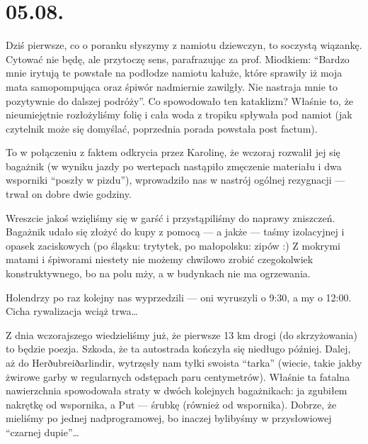 \chapter*{05.08.}

Dziś pierwsze, co o poranku słyszymy z namiotu dziewczyn, to soczystą wiązankę. Cytować nie będę, ale przytoczę sens, parafrazując za prof. Miodkiem: “Bardzo mnie irytują te powstałe na podłodze namiotu kałuże, które sprawiły iż moja mata samopompująca oraz śpiwór nadmiernie zawilgły. Nie nastraja mnie to pozytywnie do dalszej podróży”. Co spowodowało ten kataklizm? Właśnie to, że nieumiejętnie rozłożyliśmy folię i cała woda z tropiku spływała pod namiot (jak czytelnik może się domyślać, poprzednia porada powstała post factum).

To w połączeniu z faktem odkrycia przez Karolinę, że wczoraj rozwalił jej się bagażnik (w wyniku jazdy po wertepach nastąpiło zmęczenie materiału i dwa wsporniki “poszły w pizdu”), wprowadziło nas w nastrój ogólnej rezygnacji --- trwał on dobre dwie godziny.

Wreszcie jakoś wzięliśmy się w garść i przystąpiliśmy do naprawy zniszczeń. Bagażnik udało się złożyć do kupy z pomocą --- a jakże --- taśmy izolacyjnej i opasek zaciskowych (po śląsku: trytytek, po małopolsku: zipów :) Z mokrymi matami i śpiworami niestety nie możemy chwilowo zrobić czegokolwiek konstruktywnego, bo na polu mży, a w budynkach nie ma ogrzewania.

Holendrzy po raz kolejny nas wyprzedzili --- oni wyruszyli o 9:30, a my o 12:00. Cicha rywalizacja wciąż trwa…

Z dnia wczorajszego wiedzieliśmy już, że pierwsze 13 km drogi (do skrzyżowania) to będzie poezja. Szkoda, że ta autostrada kończyła się niedługo później. Dalej, aż do Herðubreiðarlindir, wytrzęsły nam tyłki swoista “tarka” (wiecie, takie jakby żwirowe garby w regularnych odstępach paru centymetrów). Właśnie ta fatalna nawierzchnia spowodowała straty w dwóch kolejnych bagażnikach: ja zgubiłem nakrętkę od wspornika, a Put --- śrubkę (również od wspornika). Dobrze, że mieliśmy po jednej nadprogramowej, bo inaczej bylibyśmy w przysłowiowej “czarnej dupie”…



